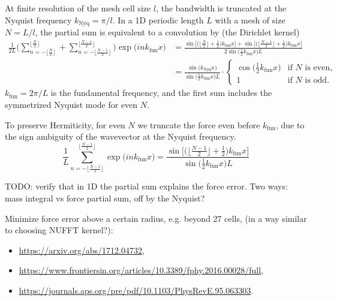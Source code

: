 \documentclass[a4paper]{article}
\newcommand{\knyq}{k_\mathrm{Nyq}}
\newcommand{\kfun}{k_\mathrm{fun}}
\newcommand{\YL}[1]{\textcolor{Bittersweet}{#1}}
\begin{document}
At finite resolution of the mesh cell size $l$, the bandwidth is
truncated at the Nyquist frequency $\knyq = \pi / l$.
In a 1D periodic length $L$ with a mesh of size $N = L / l$, the
partial sum is equivalent to a convolution by (the Dirichlet kernel)
%
\begin{align}
\frac1{2 L} \Bigg(
  \sum_{n=-\lfloor \frac{N}2\rfloor}^{\lfloor \frac{N}2\rfloor}
  + \sum_{n=-\lfloor \frac{N-1}2\rfloor}^{\lfloor \frac{N-1}2\rfloor}
\Bigg)
\exp\bigl( i n\kfun x \bigr)
%
&= \frac{
  \sin \bigl[
    \bigl( \bigl\lfloor\frac{N}2\bigr\rfloor + \frac12 \bigr) \kfun x
  \bigr]
  + \sin \bigl[
    \bigl( \bigl\lfloor\frac{N-1}2\bigr\rfloor + \frac12 \bigr) \kfun x
  \bigr]
}{2 \sin \bigl( \frac12 \kfun x \bigr) L} \nonumber\\
%
&= \frac{\sin \bigl( \knyq x \bigr)}
        {\sin \bigl( \frac12 \kfun x \bigr) L}
  \cdot \begin{cases}
    \cos \bigl( \frac12 \kfun x \bigr) & \text{if } N \text{ is even}, \\
    1 & \text{if } N \text{ is odd}.
  \end{cases}
\end{align}
%
$\kfun = 2\pi / L$ is the fundamental frequency, and the first sum
includes the symmetrized Nyquist mode for even $N$.

To preserve Hermiticity, for even $N$ we truncate the force even before
$\kfun$, due to the sign ambiguity of the wavevector at the Nyquist
frequency.
%
\begin{equation}
\frac1L
  \sum_{n=-\lfloor \frac{N-1}2\rfloor}^{\lfloor \frac{N-1}2\rfloor}
  \exp\bigl( i n\kfun x \bigr)
%
= \frac{\sin \bigl[
    \bigl( \bigl\lfloor\frac{N-1}2\bigr\rfloor + \frac12 \bigr) \kfun x
  \bigr]
}{\sin \bigl( \frac12 \kfun x \bigr) L}
\end{equation}


\YL{TODO: verify that in 1D the partial sum explains the force error.
Two ways: mass integral vs force partial sum, off by the Nyquist?}


\YL{Minimize force error above a certain radius, e.g. beyond 27 cells,
(in a way similar to choosing NUFFT kernel?):
\begin{itemize}
\item \url{https://arxiv.org/abs/1712.04732},
\item \url{https://www.frontiersin.org/articles/10.3389/fphy.2016.00028/full},
\item \url{https://journals.aps.org/pre/pdf/10.1103/PhysRevE.95.063303}.
\end{itemize}
}
\end{document}
